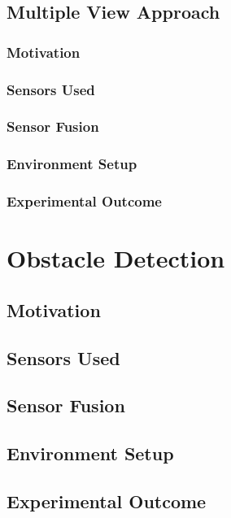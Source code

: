 \subsection{Multiple View Approach}

\subsubsection{Motivation}

\subsubsection{Sensors Used}

\subsubsection{Sensor Fusion}

\subsubsection{Environment Setup}

\subsubsection{Experimental Outcome}




\section{Obstacle Detection}

\subsection{Motivation}

\subsection{Sensors Used}

\subsection{Sensor Fusion}

\subsection{Environment Setup}

\subsection{Experimental Outcome}


